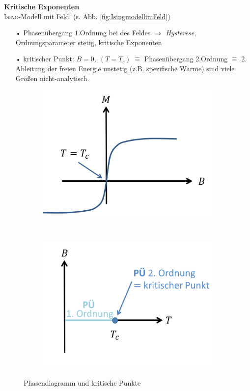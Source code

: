 \documentclass[12pt]{article}
\begin{document}
\textbf{Kritische Exponenten} \\
\textsc{Ising}-Modell mit Feld. (s. Abb. \ref{fig:IsingmodellimFeld})
\begin{itemize}
\item[•] Phasenübergang $1.$Ordnung bei %
des Feldes $\Rightarrow$ \textit{Hysterese}, Ordnungsparameter stetig, kritische Exponenten

\item[•] kritischer Punkt: $B=0, \; (T= T_c) \;  \widehat{=}$ Phasenübergang 2.Ordnung $\widehat{=} $ 2. Ableitung der freien Energie unstetig (z.B. spezifische Wärme) %
sind viele Größen nicht-analytisch. 
\end{itemize}
\begin{figure}[h] 
		\begin{subfigure}[h]{0.5 \textwidth}
		\centering
		\includegraphics[width=\textwidth]{Folie37.png}
		\caption{} 
		\centering
	\end{subfigure}
	~
\begin{subfigure}[h]{0.5\textwidth}
		\centering
		\includegraphics[width=\textwidth]{Folie38.png}
		\caption{}
		\centering
	\end{subfigure}
	\caption{ Phasendiagramm und kritische Punkte} \label{Phasendiagramm}
\end{figure}	
\end{document}
